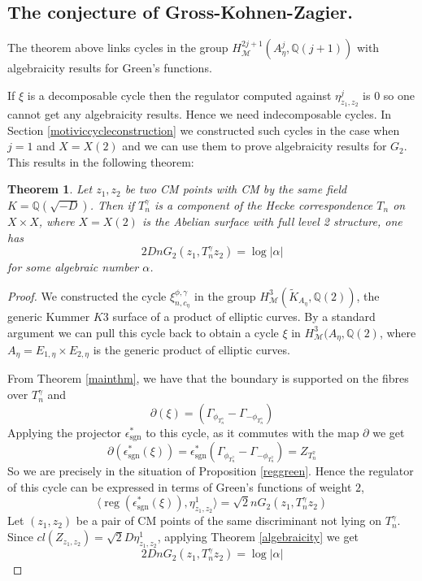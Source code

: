 \documentclass[11pt,a4paper]{article}
\newtheorem{thm}[defn]{Theorem}
\newcommand {\Q}{{\mathds Q}}
\newcommand {\M}{{\mathcal M}}
\newcommand {\TK}{{\tilde{K}}}
\def\sgn{\operatorname{sgn}}
\def\reg{\operatorname{reg}}
\newcommand {\es}{{\epsilon^*_{\sgn}}}
\begin{document}
\subsection{The conjecture of Gross-Kohnen-Zagier.}

The theorem above links cycles in the group $H^{2j+1}_{\M}(A^j_{\eta},\Q(j+1))$ with algebraicity results for Green's functions. 

If $\xi$ is a decomposable cycle then the regulator computed against $\eta_{z_1,z_2}^j$ is $0$ so one cannot get any algebraicity results. Hence we need indecomposable cycles. 
In Section \ref{motiviccycleconstruction} we constructed such cycles in the case when $j=1$ and $X=X(2)$ and we can use them to prove algebraicity results for $G_2$. This results in the following theorem:

\begin{thm} Let $z_1,z_2$ be two CM points with CM by the same field $K=\Q(\sqrt{-D})$. Then  if $T_n^{\gamma}$ is a component of the Hecke correspondence $T_n$ on $X \times X$, where $X=X(2)$ is the Abelian surface with full level 2 structure, one has 
	$$2Dn G_2(z_1,T_n^{\gamma}z_2)=\log|\alpha|$$
	for some algebraic number $\alpha$. 

\label{zagierconjecture}
\end{thm}
\begin{proof}

We constructed the cycle $\xi_{n,c_{\eta}}^{\phi,\gamma}$ in the group $H^3_{\M}(\TK_{A_{\eta}},\Q(2))$, the generic  Kummer $K3$ surface of a product of elliptic curves. By a standard argument we can pull this cycle back to obtain a cycle $\xi$ in $H^3_{\M}(A_{\eta},\Q(2)$, where $A_{\eta}=E_{1,\eta} \times E_{2,\eta}$ is the generic product of elliptic curves. 

From Theorem \ref{mainthm}, we have that the boundary is supported on the fibres over $T^{\gamma}_n$ and 
%
$$\partial(\xi)=(\Gamma_{\phi_{T_n^{\gamma}}}-\Gamma_{-\phi_{T_n^{\gamma}}})$$
%
Applying the projector $\es$  to this cycle, as it commutes with the map $\partial$  we get  %
$$\partial(\es(\xi))=\es(\Gamma_{\phi_{T_n^{\gamma}}}-\Gamma_{-\phi_{T_n^{\gamma}}})=Z_{T^{\gamma}_n}$$ 
%
So we are precisely in the situation of Proposition \ref{reggreen}. Hence the regulator of this cycle can be expressed in terms of Green's functions of weight $2$,
%
$$\langle \reg(\es(\xi)),\eta^1_{z_1,z_2} \rangle= \sqrt{2} n G_2(z_1,T^{\gamma}_n z_2)$$
%	
Let $(z_1,z_2)$ be a pair of CM points of the same discriminant  not lying on $T_n^{\gamma}$.  Since $cl(Z_{z_1,z_2})=\sqrt{2} D  \eta_{z_1,z_2}^1$, applying  Theorem \ref{algebraicity} we get 
%
$$2Dn G_2(z_1,T_n^{\gamma}z_2)=\log|\alpha|$$



\end{proof}
\end{document}
